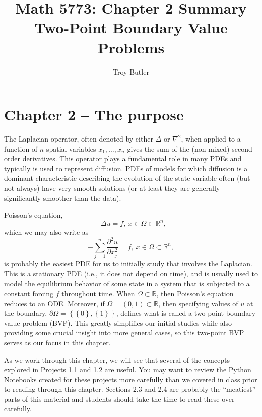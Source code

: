 \documentclass{amsart}
\theoremstyle{plain}
\theoremstyle{definition}
\theoremstyle{remark}
\theoremstyle{definition}
\numberwithin{equation}{section}
\numberwithin{equation}{section}
\newcommand{\set}[1]{\left\{#1\right\}}
\begin{document}
\title{Math 5773: Chapter 2 Summary\\ Two-Point Boundary Value Problems}
\author{Troy Butler}

\maketitle


\setcounter{section}{2}
\section*{Chapter 2 -- The purpose}

The Laplacian operator, often denoted by either $\Delta$ or $\nabla^2$, when applied to a function of $n$ spatial variables $x_1, \ldots, x_n$ gives the sum of the (non-mixed) second-order derivatives.
This operator plays a fundamental role in many PDEs and typically is used to represent diffusion.
PDEs of models for which diffusion is a dominant characteristic describing the evolution of the state variable often (but not always) have very smooth solutions (or at least they are generally significantly  smoother than the data). 

Poisson's equation,
\[
	-\Delta u = f, \ x\in\Omega\subset\mathbb{R}^n,
\]
which we may also write as
\[
	-\sum_{j=1}^n \frac{\partial^2 u}{\partial x_j^2} = f, \ x\in\Omega\subset\mathbb{R}^n,
\]
is probably the easiest PDE for us to initially study that involves the Laplacian. 
This is a stationary PDE (i.e., it does not depend on time), and is usually used to model the equilibrium behavior of some state in a system that is subjected to a constant forcing $f$ throughout time. 
When $\Omega\subset\mathbb{R}$, then Poisson's equation reduces to an ODE.
Moreover, if $\Omega = (0,1)\subset\mathbb{R}$, then specifying values of $u$ at the boundary, $\partial\Omega = \set{\set{0}, \set{1}}$, defines what is called a two-point boundary value problem (BVP). 
This greatly simplifies our initial studies while also providing some crucial insight into more general cases, so this two-point BVP serves as our focus in this chapter.

As we work through this chapter, we will see that several of the concepts explored in Projects 1.1 and 1.2 are useful. 
You may want to review the Python Notebooks created for these projects more carefully than we covered in class prior to reading through this chapter. 
Sections 2.3 and 2.4 are probably the ``meatiest'' parts of this material and students should take the time to read these over carefully. 
\end{document}
